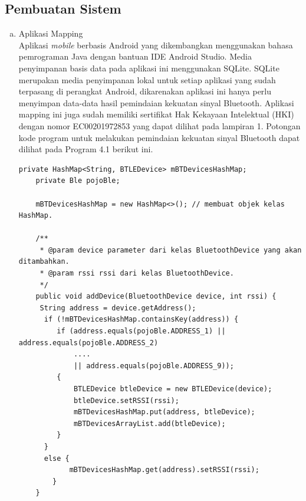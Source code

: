 \subsection{Pembuatan Sistem}

\begin{enumerate}[a.]
	\item Aplikasi Mapping
	      \\ Aplikasi \textit{mobile} berbasis Android yang dikembangkan menggunakan bahasa pemrograman Java dengan bantuan IDE Android Studio. Media penyimpanan basis data pada aplikasi ini menggunakan SQLite. SQLite merupakan media penyimpanan lokal untuk setiap aplikasi yang sudah terpasang di perangkat Android, dikarenakan aplikasi ini hanya perlu menyimpan data-data hasil pemindaian kekuatan sinyal Bluetooth. Aplikasi mapping ini juga sudah memiliki sertifikat Hak Kekayaan Intelektual (HKI) dengan nomor EC00201972853 yang dapat dilihat pada lampiran 1. Potongan kode program untuk melakukan pemindaian kekuatan sinyal Bluetooth dapat dilihat pada Program 4.1 berikut ini.
	      \vspace{0.4cm}
	      \begin{lstlisting}[label=programScanBle]
    private HashMap<String, BTLEDevice> mBTDevicesHashMap;
    private Ble pojoBle;

    mBTDevicesHashMap = new HashMap<>(); // membuat objek kelas HashMap.
	
	/**
     * @param device parameter dari kelas BluetoothDevice yang akan ditambahkan.
     * @param rssi rssi dari kelas BluetoothDevice.
     */
    public void addDevice(BluetoothDevice device, int rssi) {
     String address = device.getAddress();
      if (!mBTDevicesHashMap.containsKey(address)) {
         if (address.equals(pojoBle.ADDRESS_1) || address.equals(pojoBle.ADDRESS_2) 
             .... 
             || address.equals(pojoBle.ADDRESS_9));
         {
             BTLEDevice btleDevice = new BTLEDevice(device);
             btleDevice.setRSSI(rssi);
             mBTDevicesHashMap.put(address, btleDevice);
             mBTDevicesArrayList.add(btleDevice);
         }
      }
      else {
            mBTDevicesHashMap.get(address).setRSSI(rssi);
        }
    }
	\end{lstlisting}



\end{enumerate}

